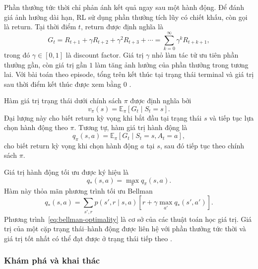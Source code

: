 Phần thưởng tức thời chỉ phản ánh kết quả ngay sau một hành động. Để đánh giá ảnh hưởng dài hạn, RL sử dụng phần thưởng tích lũy có chiết khấu, còn gọi là return. Tại thời điểm $t$, return được định nghĩa là
\begin{equation}
    G_t
    =
    R_{t+1}
    + \gamma R_{t+2}
    + \gamma^2 R_{t+3}
    + \cdots
    =
    \sum_{k=0}^{\infty}\gamma^k R_{t+k+1},
    \label{eq:discounted-return}
\end{equation}
trong đó $\gamma \in [0,1]$ là discount factor. Giá trị $\gamma$ nhỏ làm tác tử ưu tiên phần thưởng gần, còn giá trị gần $1$ làm tăng ảnh hưởng của phần thưởng trong tương lai. Với bài toán theo episode, tổng trên kết thúc tại trạng thái terminal và giá trị sau thời điểm kết thúc được xem bằng $0$ \cite{SuttonBarto2018}.

Hàm giá trị trạng thái dưới chính sách $\pi$ được định nghĩa bởi
\begin{equation}
    v_{\pi}(s)
    =
    \mathbb{E}_{\pi}\!\left[G_t \mid S_t=s\right].
    \label{eq:state-value}
\end{equation}
Đại lượng này cho biết return kỳ vọng khi bắt đầu tại trạng thái $s$ và tiếp tục lựa chọn hành động theo $\pi$. Tương tự, hàm giá trị hành động là
\begin{equation}
    q_{\pi}(s,a)
    =
    \mathbb{E}_{\pi}\!\left[G_t \mid S_t=s, A_t=a\right],
    \label{eq:action-value}
\end{equation}
cho biết return kỳ vọng khi chọn hành động $a$ tại $s$, sau đó tiếp tục theo chính sách $\pi$.

Giá trị hành động tối ưu được ký hiệu là
\begin{equation}
    q_{*}(s,a)
    =
    \max_{\pi} q_{\pi}(s,a).
    \label{eq:optimal-action-value}
\end{equation}
Hàm này thỏa mãn phương trình tối ưu Bellman
\begin{equation}
    q_{*}(s,a)
    =
    \sum_{s',r}
    p(s',r \mid s,a)
    \left[
        r + \gamma \max_{a'} q_{*}(s',a')
    \right].
    \label{eq:bellman-optimality}
\end{equation}
Phương trình~\eqref{eq:bellman-optimality} là cơ sở của các thuật toán học giá trị. Giá trị của một cặp trạng thái--hành động được liên hệ với phần thưởng tức thời và giá trị tốt nhất có thể đạt được ở trạng thái tiếp theo \cite{SuttonBarto2018}.

\subsubsection{Khám phá và khai thác}

